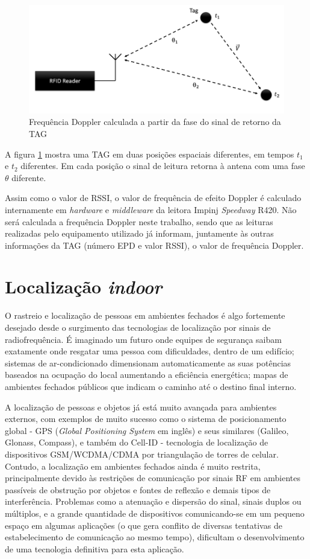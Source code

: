 \begin{figure}[H]
    \centering
    \includegraphics[width=0.8\linewidth]{figs/Fundamentos/doppler.PNG}
    \caption{Frequência Doppler calculada a partir da fase do sinal de retorno da TAG \cite{tesch2015rfid}}
    \label{fig:dopplerFund}
\end{figure}

A figura \ref{fig:dopplerFund} mostra uma TAG em duas posições espaciais diferentes, em tempos $t_1$ e $t_2$ diferentes. Em cada posição o sinal de leitura retorna à antena com uma fase $\theta$ diferente.

Assim como o valor de RSSI, o valor de frequência de efeito Doppler é calculado internamente em \textit{hardware} e \textit{middleware} da leitora Impinj \textit{Speedway} R420. Não será calculada a frequência Doppler neste trabalho, sendo que as leituras realizadas pelo equipamento utilizado já informam, juntamente às outras informações da TAG (número EPD e valor RSSI), o valor de frequência Doppler.
    
\section{Localização \textit{indoor}}

O rastreio e localização de pessoas em ambientes fechados é algo fortemente desejado desde o surgimento das tecnologias de localização por sinais de radiofrequência. É imaginado um futuro onde equipes de segurança saibam exatamente onde resgatar uma pessoa com dificuldades, dentro de um edifício; sistemas de ar-condicionado dimensionam automaticamente as suas potências baseados na ocupação do local aumentando a eficiência energética; mapas de ambientes fechados públicos que indicam o caminho até o destino final interno.

A localização de pessoas e objetos já está muito avançada para ambientes externos, com exemplos de muito sucesso como o sistema de posicionamento global - GPS (\textit{Global Positioning System} em inglês) e seus similares (Galileo, Glonass, Compass), e também do Cell-ID - tecnologia de localização de dispositivos GSM/WCDMA/CDMA por triangulação de torres de celular. Contudo, a localização em ambientes fechados ainda é muito restrita, principalmente devido às restrições de comunicação por sinais RF em ambientes passíveis de obstrução por objetos e fontes de reflexão e demais tipos de interferência. Problemas como a atenuação e dispersão do sinal, sinais duplos ou múltiplos, e a grande quantidade de dispositivos comunicando-se em um pequeno espaço em algumas aplicações (o que gera conflito de diversas tentativas de estabelecimento de comunicação ao mesmo tempo), dificultam o desenvolvimento de uma tecnologia definitiva para esta aplicação.

